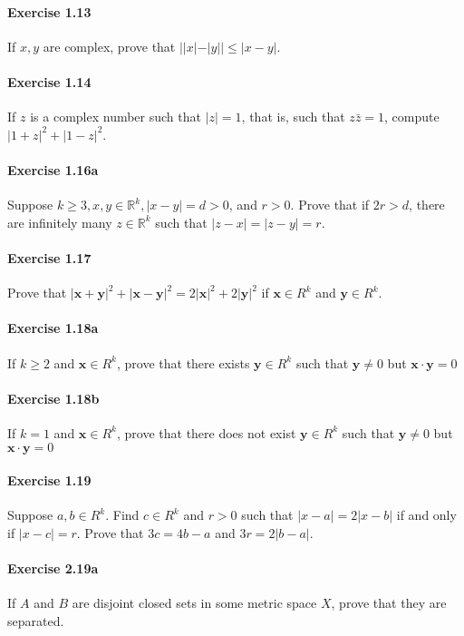 \documentclass{article}
\begin{document}
\paragraph{Exercise 1.13} If $x, y$ are complex, prove that $||x|-|y|| \leq |x-y|$.

\paragraph{Exercise 1.14} If $z$ is a complex number such that $|z|=1$, that is, such that $z \bar{z}=1$, compute $|1+z|^{2}+|1-z|^{2}$.

\paragraph{Exercise 1.16a} Suppose $k \geq 3, x, y \in \mathbb{R}^k, |x - y| = d > 0$, and $r > 0$. Prove that if $2r > d$, there are infinitely many $z \in \mathbb{R}^k$ such that $|z-x|=|z-y|=r$.

\paragraph{Exercise 1.17} Prove that $|\mathbf{x}+\mathbf{y}|^{2}+|\mathbf{x}-\mathbf{y}|^{2}=2|\mathbf{x}|^{2}+2|\mathbf{y}|^{2}$ if $\mathbf{x} \in R^{k}$ and $\mathbf{y} \in R^{k}$.

\paragraph{Exercise 1.18a} If $k \geq 2$ and $\mathbf{x} \in R^{k}$, prove that there exists $\mathbf{y} \in R^{k}$ such that $\mathbf{y} \neq 0$ but $\mathbf{x} \cdot \mathbf{y}=0$

\paragraph{Exercise 1.18b} If $k = 1$ and $\mathbf{x} \in R^{k}$, prove that there does not exist $\mathbf{y} \in R^{k}$ such that $\mathbf{y} \neq 0$ but $\mathbf{x} \cdot \mathbf{y}=0$

\paragraph{Exercise 1.19} Suppose $a, b \in R^k$. Find $c \in R^k$ and $r > 0$ such that $|x-a|=2|x-b|$ if and only if $| x - c | = r$. Prove that $3c = 4b - a$ and $3r = 2 |b - a|$.

\paragraph{Exercise 2.19a} If $A$ and $B$ are disjoint closed sets in some metric space $X$, prove that they are separated.
\end{document}
